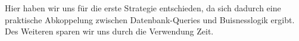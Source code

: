 \documentclass[enabledeprecatedfontcommands,fontsize=12pt,paper=a4,twoside]{scrartcl}
\begin{document}


Hier haben wir uns für die erste Strategie entschieden, da sich dadurch eine praktische Abkoppelung zwischen Datenbank-Queries und Buisnesslogik ergibt. Des Weiteren sparen wir uns durch die Verwendung Zeit. \\
\end{document}
